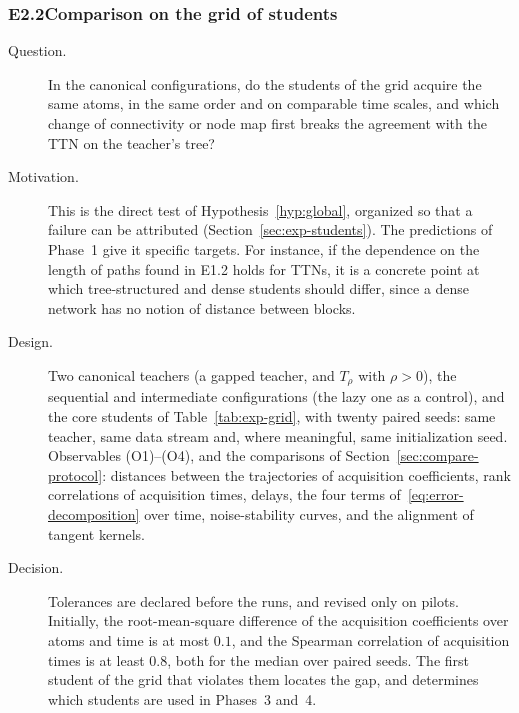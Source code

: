 \documentclass[11pt]{article}
\theoremstyle{definition}
\numberwithin{equation}{section}
\begin{document}
\subsubsection*{E2.2\quad Comparison on the grid of students}
\begin{description}
\item[Question.] In the canonical configurations, do the students of the grid acquire the same atoms, in the same order and on comparable time scales, and which change of connectivity or node map first breaks the agreement with the TTN on the teacher's tree?
\item[Motivation.] This is the direct test of Hypothesis~\ref{hyp:global}, organized so that a failure can be attributed (Section~\ref{sec:exp-students}). The predictions of Phase~1 give it specific targets. For instance, if the dependence on the length of paths found in E1.2 holds for TTNs, it is a concrete point at which tree-structured and dense students should differ, since a dense network has no notion of distance between blocks.
\item[Design.] Two canonical teachers (a gapped teacher, and $T_\rho$ with $\rho>0$), the sequential and intermediate configurations (the lazy one as a control), and the core students of Table~\ref{tab:exp-grid}, with twenty paired seeds: same teacher, same data stream and, where meaningful, same initialization seed. Observables (O1)--(O4), and the comparisons of Section~\ref{sec:compare-protocol}: distances between the trajectories of acquisition coefficients, rank correlations of acquisition times, delays, the four terms of~\eqref{eq:error-decomposition} over time, noise-stability curves, and the alignment of tangent kernels.
\item[Decision.] Tolerances are declared before the runs, and revised only on pilots. Initially, the root-mean-square difference of the acquisition coefficients over atoms and time is at most $0.1$, and the Spearman correlation of acquisition times is at least $0.8$, both for the median over paired seeds. The first student of the grid that violates them locates the gap, and determines which students are used in Phases~3 and~4.
\end{description}
\end{document}
